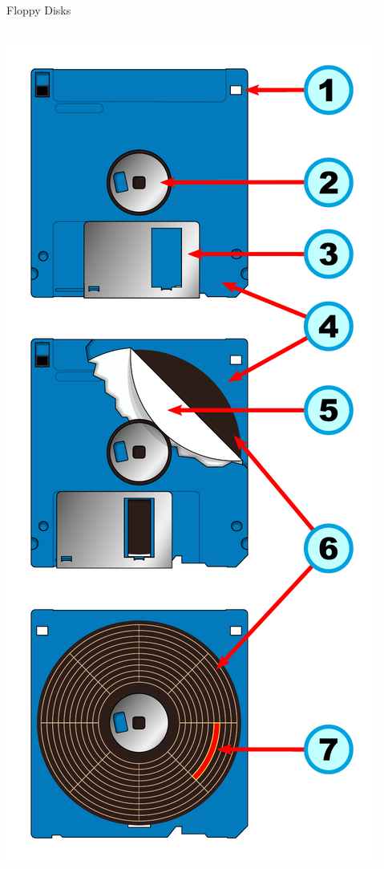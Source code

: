 \documentclass{lug}
\begin{document}
\begin{frame}{Floppy Disks}
\begin{columns}
\begin{column}{0.3\textwidth}
            \includegraphics[width=\textwidth]{graphics/floppy_inside}
        \end{column}
    \end{columns}
\end{frame}
\end{document}
